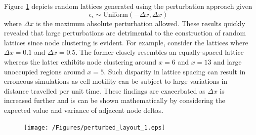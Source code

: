 \documentclass[11pt,a4paper]{article}
\begin{document}
		Figure \ref{fig:perturbed_layout_1} depicts random lattices generated using the perturbation approach given
		\begin{equation}
			\label{eq:epsilon_dist}
			\epsilon_i \sim \text{Uniform}(-\Delta x, \Delta x)
		\end{equation}
		where $\Delta x$ is the maximum absolute perturbation allowed. These results quickly revealed that large perturbations are detrimental to the construction of random lattices since node clustering is evident. For example, consider the lattices where $\Delta x = 0.1$ and $\Delta x = 0.5$. The former closely resembles an equally-spaced lattice whereas the latter exhibits node clustering around $x = 6$ and $x = 13$ and large unoccupied regions around $x = 5$. Such disparity in lattice spacing can result in erroneous simulations as cell motility can be subject to large variations in distance travelled per unit time. These findings are exacerbated as $\Delta x$ is increased further and is can be shown mathematically by considering the expected value and variance of adjacent node deltas.

		\begin{figure}[tbh]
			\centering
				\texttt{[image: /Figures/perturbed\_layout\_1.eps]}
			\caption{ }
			\label{fig:perturbed_layout_1}
		\end{figure}
\end{document}
